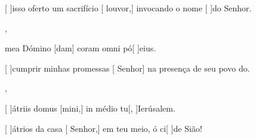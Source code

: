{    {\item {}[ ]{is}so oferto um sacrifício [ louvor,] invocando o nome [ ]{do} Senhor.},
  {\item {} mea Dómino [dam] coram omni pó[ ]{e}ius.}%
    {\item {}[ ]{cum}prir minhas promessas [ Senhor] na presença de seu povo do.},
  {\item {}[ ]{á}triis domus [mini,] in médio tu[, ]{Ie}{rú}salem.}%
    {\item {}[ ]{á}trios da casa [ Senhor,] em teu meio, ó ci[ ]{de} Sião!}
}